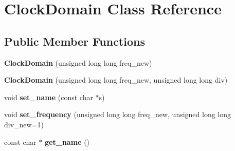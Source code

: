 \hypertarget{classClockDomain}{\section{Clock\-Domain Class Reference}
\label{classClockDomain}
}
\subsection*{Public Member Functions}
\begin{DoxyCompactItemize}
\item 
\hypertarget{classClockDomain_af2b356eebbe8a39f26a433ffee57b86f}{{\bfseries Clock\-Domain} (unsigned long long freq\-\_\-new)}\label{classClockDomain_af2b356eebbe8a39f26a433ffee57b86f}

\item 
\hypertarget{classClockDomain_a6cc96fd5740134714c1bedc92af55ef0}{{\bfseries Clock\-Domain} (unsigned long long freq\-\_\-new, unsigned long long div)}\label{classClockDomain_a6cc96fd5740134714c1bedc92af55ef0}

\item 
\hypertarget{classClockDomain_a93065173b0e0b4f0551dee4f4bf58355}{void {\bfseries set\-\_\-name} (const char $\ast$s)}\label{classClockDomain_a93065173b0e0b4f0551dee4f4bf58355}

\item 
\hypertarget{classClockDomain_ab7dc80b22d2c1fe4ae72372cd03dddc5}{void {\bfseries set\-\_\-frequency} (unsigned long long freq\-\_\-new, unsigned long long div\-\_\-new=1)}\label{classClockDomain_ab7dc80b22d2c1fe4ae72372cd03dddc5}

\item 
\hypertarget{classClockDomain_a42b2b3e1745799744508ecc35d9d7e52}{const char $\ast$ {\bfseries get\-\_\-name} ()}\label{classClockDomain_a42b2b3e1745799744508ecc35d9d7e52}

\end{DoxyCompactItemize}
